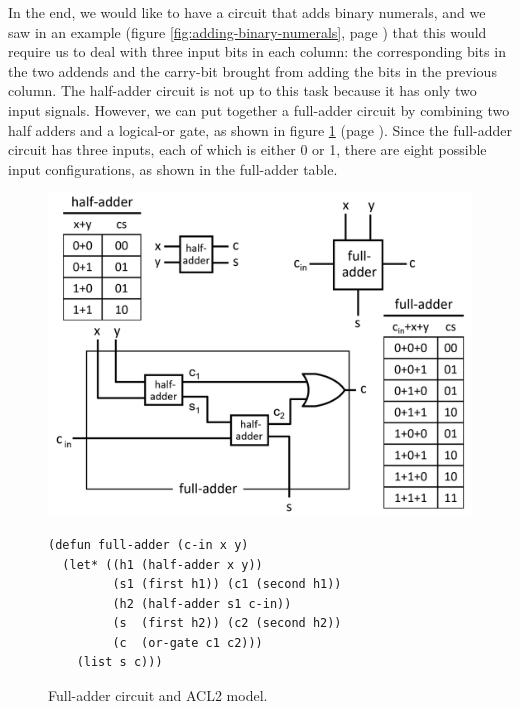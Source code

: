 In the end, we would like to have a circuit
that adds binary numerals,
and we saw in an example
(figure \ref{fig:adding-binary-numerals}, page \pageref{fig:adding-binary-numerals})
that this would require us to deal with three input bits
in each column:
the corresponding bits in the two addends
and the carry-bit brought from adding
the bits in the previous column.
The half-adder circuit is not up to this task
because it has only two input signals.
However, we can put together a full-adder circuit
by combining two half adders and a logical-or gate,
as shown in figure \ref{fig:full-adder}
(page \pageref{fig:full-adder}).
Since the full-adder circuit has three inputs,
each of which is either 0 or 1,
there are eight possible input configurations,
as shown in the full-adder table.

\begin{figure}
\begin{center}
\includegraphics[scale=1]{images-cmyk/full-adder}
\begin{code}
\begin{verbatim}
(defun full-adder (c-in x y)
  (let* ((h1 (half-adder x y))
         (s1 (first h1)) (c1 (second h1))
         (h2 (half-adder s1 c-in))
         (s  (first h2)) (c2 (second h2))
         (c  (or-gate c1 c2)))
    (list s c)))
\end{verbatim}
\end{code}
\end{center}
\caption{Full-adder circuit and ACL2 model.}
\label{fig:full-adder}
\end{figure}

